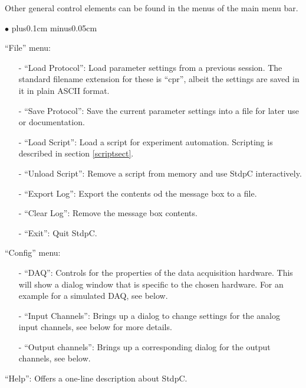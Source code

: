 \documentclass{article}
\newenvironment{myitem}{\begin{list}{$\bullet$}{\setlength{\leftmargin}{1.1em}
\itemsep0.1cm plus0.1cm minus0.05cm
\listparindent0cm
\addtolength{\labelsep}{0.5\labelsep}
\setlength{\labelwidth}{0.8em}
\setlength{\leftmargin}{\labelwidth}
\addtolength{\leftmargin}{\labelsep}
}}{\end{list}}
\begin{document}
Other general control elements can be found in the menus of the main
menu bar. 
\begin{myitem}
\item ``File'' menu:
\
\begin{itemize}
\item[-] ``Load Protocol'': Load parameter settings from a previous
  session. The standard filename extension for these is ``cpr'',
  albeit the settings are saved in it in plain ASCII format.
\item[-] ``Save Protocol'': Save the current parameter settings into a
  file for later use or documentation.
 \item[-] ``Load Script'': Load a script for experiment
   automation. Scripting is described in section \ref{scriptsect}.
\item[-] ``Unload Script'': Remove a script from memory and use StdpC
  interactively.
\item[-] ``Export Log'': Export the contents od the message box to a
  file.
\item[-] ``Clear Log'': Remove the message box contents.
\item[-] ``Exit'': Quit StdpC.
\end{itemize}
\item ``Config'' menu:
\begin{itemize}
\item[-] ``DAQ'': Controls for the properties of the data acquisition
  hardware. This will show a dialog window that is specific to the
  chosen hardware. For an example for a simulated DAQ, see below.
\item[-] ``Input Channels'': Brings up a dialog to change settings for
  the analog input channels, see below for more details.
\item[-] ``Output channels'': Brings up a corresponding dialog for the
  output channels, see below.
\end{itemize}
\item ``Help'': Offers a one-line description about StdpC. 
\end{myitem}
\end{document}
